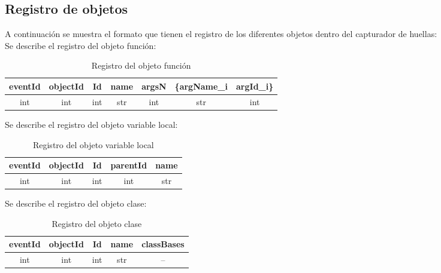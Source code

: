 \documentclass[10pt,a4paper]{article}
\begin{document}
\subsection{Registro de objetos}

A continuación se muestra el formato que tienen el registro de los diferentes objetos dentro del capturador de huellas:\\

Se describe el registro del objeto función:\\

\begin{table}[!h]
\begin{center}
\begin{tabular}{| c | c | c | c | c | c | c |}
\hline
eventId & objectId & Id & name & argsN & \{argName_{i} & argId_{i}\}\\
\hline
int & int & int & str & int & str & int \\
\hline
\end{tabular}
\caption{Registro del objeto función} 
\end{center}
\end{table}


Se describe el registro del objeto variable local:\\

\begin{table}[!h]
\begin{center}
\begin{tabular}{| c | c | c | c | c |}
\hline
eventId & objectId & Id & parentId & name\\
\hline
int & int & int & int & str\\
\hline
\end{tabular}
\caption{Registro del objeto variable local} 
\end{center}
\end{table}


Se describe el registro del objeto clase:\\

\begin{table}[!h]
\begin{center}
\begin{tabular}{| c | c | c | c | c |}
\hline
eventId & objectId & Id & name & classBases\\
\hline
int & int & int & str & --\footnotemark[1]\\
\hline
\end{tabular}
\caption{Registro del objeto clase} 
\end{center}
\end{table}
\end{document}
